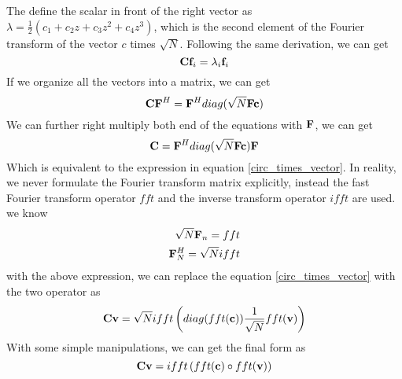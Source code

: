 \documentclass[revised,endfloat]{geophysics}
\begin{document}
The define the scalar in front of the right vector as $\lambda = \frac{1}{2}\left(c_1 + c_2 z + c_3 z^2 + c_4 z^3 \right) $, which is the second element of the Fourier transform of the vector $c$ times $\sqrt{N}$. Following the same derivation, we can get
\begin{equation}
{\bf C} {\bf f}_i = \lambda_i  {\bf f}_i
\end{equation}
If we organize all the vectors into a matrix, we can get
\begin{equation}
{\bf C}{\bf F}^H = {\bf F}^H diag(\sqrt{N}{\bf F}{\bf c})
\end{equation}
We can further right multiply both end of the equations with ${\bf F}$, we can get
\begin{equation}
{\bf C} = {\bf F}^H diag(\sqrt{N}{\bf F}{\bf c}) {\bf F}
\label{decom}
\end{equation}
Which is equivalent to the expression in equation \ref{circ_times_vector}. In reality, we never formulate the Fourier transform matrix explicitly, instead the fast Fourier transform operator $fft$ and the inverse transform operator $ifft$ are used. we know
\begin{equation}
\begin{split}
\sqrt{N} {\bf F}_n = fft \\
 {\bf F}_N^H = \sqrt{N} ifft
 \end{split}
\end{equation}
with the above expression, we can replace the equation \ref{circ_times_vector} with the two operator as
\begin{equation}
{\bf C} {\bf v} = \sqrt{N} ifft\left( diag(fft({\bf c}))  {\frac{1}{\sqrt{N}} fft({\bf v})} \right)
\label{decom}
\end{equation}
With some simple manipulations, we can get the final form as
\begin{equation}
{\bf C} {\bf v} =  ifft \left( fft({\bf c}) \circ  fft({\bf v}) \right)
\label{decom}
\end{equation}
\end{document}
